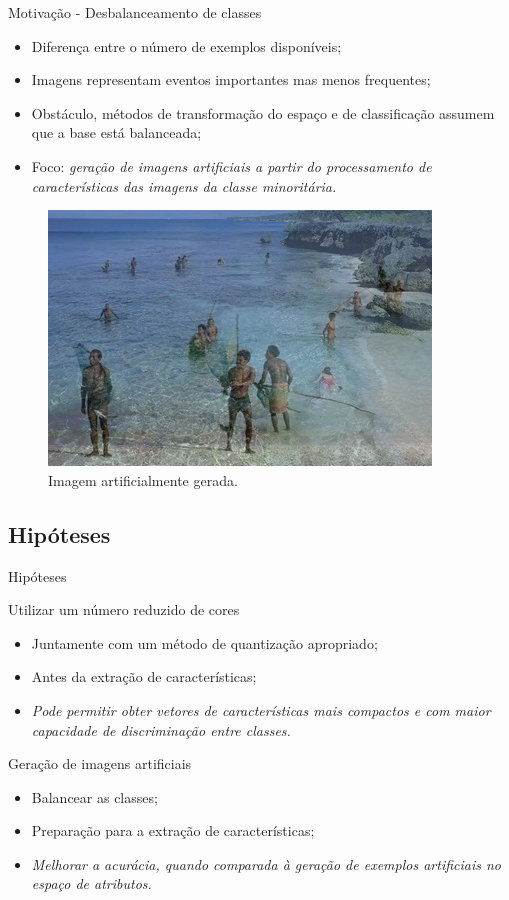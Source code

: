 \documentclass{beamer}
\begin{document}
\begin{frame}{Motivação - Desbalanceamento de classes}
\setlength\leftmargini{0em}
\justifying
  \begin{itemize}
    \item Diferença entre o número de exemplos disponíveis;
    \item Imagens representam eventos importantes mas menos frequentes;
    \item Obstáculo, métodos de transformação do espaço e de
    classificação assumem que a base está balanceada;
    \item Foco: \emph{geração de imagens artificiais a partir do processamento de características das imagens da classe minoritária.}
  \end{itemize}
  \begin{figure}[htbp]
 \begin{center}
   \includegraphics[width=.4\linewidth]{figuras/imagemgerada.jpg}
 \caption{Imagem artificialmente gerada.}
 \end{center}
\end{figure}

\end{frame}
\subsection{Hipóteses}
\setlength\leftmargini{1em}
\justifying
 \begin{frame}{Hipóteses}
  \begin{block}{Utilizar um número reduzido de cores}
    \justifying
    \begin{itemize}
      \item Juntamente com um método de quantização apropriado;
      \item Antes da extração de características;
      \item \textit{Pode permitir obter vetores de características mais compactos e com maior capacidade de discriminação entre classes.}
    \end{itemize}
  \end{block}
  \begin{block}{Geração de imagens artificiais}
    \justifying
    \begin{itemize}
      \item Balancear as classes;
      \item Preparação para a extração de características;
      \item \textit{Melhorar a acurácia, quando comparada à geração de exemplos artificiais no espaço de atributos.}
    \end{itemize}
  \end{block}
\end{frame}
\end{document}
